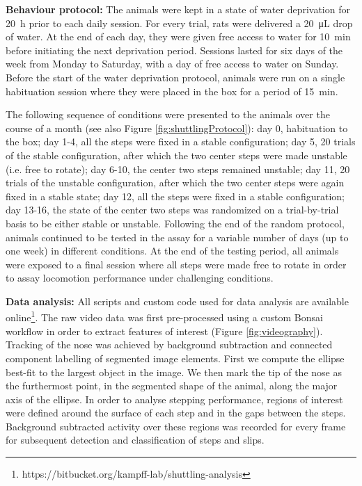 \textbf{Behaviour protocol:} The animals were kept in a state of water deprivation for \SI{20}{\hour} prior to each daily session. For every trial, rats were delivered a \SI{20}{\micro\liter} drop of water. At the end of each day, they were given free access to water for \SI{10}{\minute} before initiating the next deprivation period. Sessions lasted for six days of the week from Monday to Saturday, with a day of free access to water on Sunday. Before the start of the water deprivation protocol, animals were run on a single habituation session where they were placed in the box for a period of \SI{15}{\minute}.

The following sequence of conditions were presented to the animals over the course of a month (see also Figure \ref{fig:shuttlingProtocol}): day 0, habituation to the box; day 1-4, all the steps were fixed in a stable configuration; day 5, 20 trials of the stable configuration, after which the two center steps were made unstable (i.e. free to rotate); day 6-10, the center two steps remained unstable; day 11, 20 trials of the unstable configuration, after which the two center steps were again fixed in a stable state; day 12, all the steps were fixed in a stable configuration; day 13-16, the state of the center two steps was randomized on a trial-by-trial basis to be either stable or unstable. Following the end of the random protocol, animals continued to be tested in the assay for a variable number of days (up to one week) in different conditions. At the end of the testing period, all animals were exposed to a final session where all steps were made free to rotate in order to assay locomotion performance under challenging conditions.

\textbf{Data analysis:} All scripts and custom code used for data analysis are available online\footnote{https://bitbucket.org/kampff-lab/shuttling-analysis}. The raw video data was first pre-processed using a custom Bonsai workflow in order to extract features of interest (Figure \ref{fig:videography}). Tracking of the nose was achieved by background subtraction and connected component labelling of segmented image elements. First we compute the ellipse best-fit to the largest object in the image. We then mark the tip of the nose as the furthermost point, in the segmented shape of the animal, along the major axis of the ellipse. In order to analyse stepping performance, regions of interest were defined around the surface of each step and in the gaps between the steps. Background subtracted activity over these regions was recorded for every frame for subsequent detection and classification of steps and slips.

